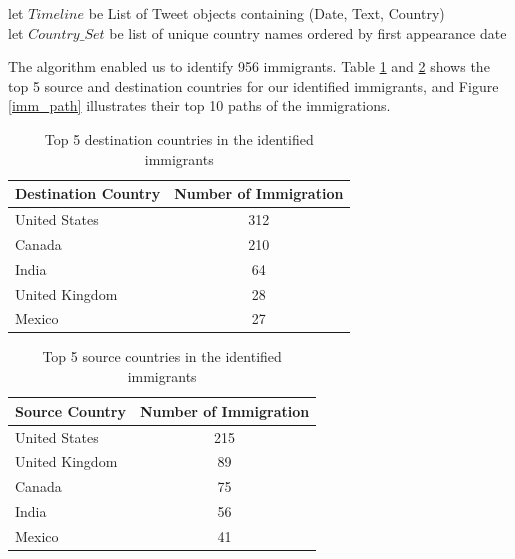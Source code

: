 \documentclass{article}
\begin{document}
\begin{algorithm}[H]
\SetAlgoLined
{}

let $Timeline$ be List of Tweet objects containing (Date, Text, Country)
\\
let $Country\_Set$ be list of unique country names ordered by first appearance date
\\

\end{algorithm}

The algorithm enabled us to identify 956 immigrants. Table \ref{tbl:1} and \ref{tbl:2} shows the top 5 source and destination countries for our identified immigrants, and Figure \ref{imm_path} illustrates their top 10 paths of the immigrations. 

\begin{table}[]
\centering
\caption{Top 5 destination countries in the identified immigrants}
\label{tbl:1}
\begin{tabular}{l|c}
Destination Country & Number of Immigration \\
\hline
United States       & 312                   \\
Canada              & 210                   \\
India               & 64                    \\
United Kingdom      & 28                    \\
Mexico              & 27                   
\end{tabular}
\end{table}

\begin{table}[]
\centering
\caption{Top 5 source countries in the identified immigrants}
\label{tbl:2}
\begin{tabular}{l|c}
Source Country & Number of Immigration \\
\hline
United States       & 215                   \\
United Kingdom      & 89                   \\
Canada              & 75                    \\
India               & 56                    \\
Mexico              & 41                   
\end{tabular}
\end{table}
\end{document}

